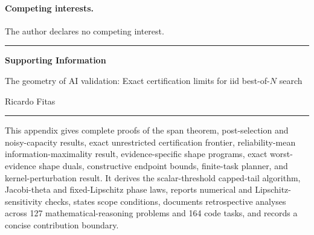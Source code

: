 \documentclass[10pt,twocolumn]{article}
\begin{document}
\paragraph{Competing interests.} The author declares no competing interest.


{\small}

\clearpage
\onecolumn
\noindent\rule{\textwidth}{1.6pt}
\begin{center}
{\LARGE\bfseries Supporting Information\par}
\vspace{0.45em}
{\large The geometry of AI validation: Exact certification limits for iid best-of-$N$ search\par}
\vspace{0.35em}
{\normalsize Ricardo Fitas\par}
\end{center}
\noindent\rule{\textwidth}{0.45pt}
\vspace{0.8em}

\newcommand{\one}{\mathbf 1}
\setcounter{equation}{0}
\setcounter{table}{0}
\setcounter{figure}{0}
\setcounter{theorem}{0}
\setcounter{lemma}{0}
\setcounter{proposition}{0}
\setcounter{corollary}{0}
\renewcommand{\theequation}{S\arabic{equation}}
\renewcommand{\thetable}{S\arabic{table}}
\renewcommand{\thefigure}{S\arabic{figure}}
\renewcommand{\thetheorem}{S\arabic{theorem}}
\renewcommand{\thelemma}{S\arabic{lemma}}
\renewcommand{\theproposition}{S\arabic{proposition}}
\renewcommand{\thecorollary}{S\arabic{corollary}}
\renewcommand{\theHequation}{S\arabic{equation}}
\renewcommand{\theHtable}{S\arabic{table}}
\renewcommand{\theHfigure}{S\arabic{figure}}
\providecommand{\theHtheorem}{}
\providecommand{\theHlemma}{}
\providecommand{\theHproposition}{}
\providecommand{\theHcorollary}{}
\renewcommand{\theHtheorem}{S\arabic{theorem}}
\renewcommand{\theHlemma}{S\arabic{lemma}}
\renewcommand{\theHproposition}{S\arabic{proposition}}
\renewcommand{\theHcorollary}{S\arabic{corollary}}

\raggedbottom

This appendix gives complete proofs of the span theorem, post-selection and noisy-capacity results, exact unrestricted certification frontier, reliability-mean information-maximality result, evidence-specific shape programs, exact worst-evidence shape duals, constructive endpoint bounds, finite-task planner, and kernel-perturbation result. It derives the scalar-threshold capped-tail algorithm, Jacobi-theta and fixed-Lipschitz phase laws, reports numerical and Lipschitz-sensitivity checks, states scope conditions, documents retrospective analyses across 127 mathematical-reasoning problems and 164 code tasks, and records a concise contribution boundary.
\end{document}
